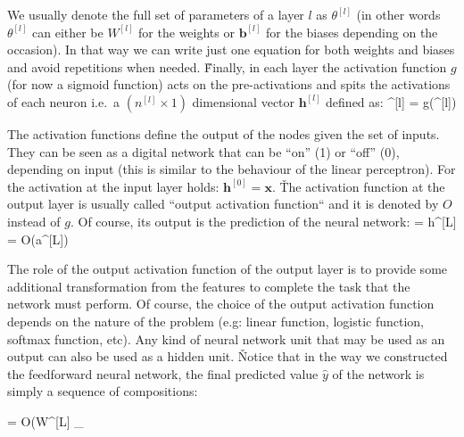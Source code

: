 \vspace{10pt}

We usually denote the full set of parameters of a layer $l$ as $\theta^{[l]}$ (in other words $\theta^{[l]}$ can
either be $W^{[l]} $ for the weights or $\boldsymbol{b}^{[l]}$ for the biases depending on the occasion). In that way
we can write just one equation for both weights and biases and avoid repetitions when needed. \v

Finally, in each layer the activation function $g$ (for now a sigmoid function) acts on the pre-activations and spits
the activations of each neuron i.e.\ a $(n^{[l]} \times 1)$ dimensional vector $\boldsymbol{h}^{[l]}$ defined as:
\bse
{}^{[l]} = g(^{[l]})
\ese

The activation functions define the output of the nodes given the set of inputs. They can be seen as a digital
network that can be ``on'' (1) or ``off'' (0), depending on input (this is similar to the behaviour of the linear
perceptron). For the activation at the input layer holds: $\boldsymbol{h}^{[0]} = \boldsymbol{x}$. \v

The activation function at the output layer is usually called ``output activation function`` and it is denoted by $O$
instead of $g$. Of course, its output is the prediction of the neural network:
\bse
{} = h^{[L]} = O(a^{[L]})
\ese

The role of the output activation function of the output layer is to provide some additional transformation from the
features to complete the task that the network must perform. Of course, the choice of the output activation function
depends on the nature of the problem (e.g: linear function, logistic function, softmax function, etc). Any kind of
neural network unit that may be used as an output can also be used as a hidden unit. \v

Notice that in the way we constructed the feedforward neural network, the final predicted value $\hat{y}$ of the
network is simply a sequence of compositions:

\bse
{} = O(W^{[L]} \cdot {}_{}
\ese

\vspace{8pt}

